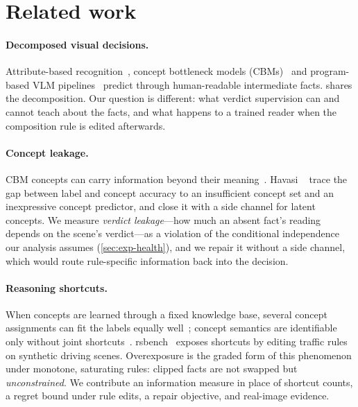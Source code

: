 \section{Related work}
\label{sec:related}

\paragraph{Decomposed visual decisions.} Attribute-based recognition~\cite{lampert2009attribute}, concept bottleneck models (CBMs)~\cite{koh2020cbm} and program-based VLM pipelines~\cite{gupta2023visprog,suris2023vipergpt} predict through human-readable intermediate facts. \lux shares the decomposition. Our question is different: what verdict supervision can and cannot teach about the facts, and what happens to a trained reader when the composition rule is edited afterwards.

\paragraph{Concept leakage.} CBM concepts can carry information beyond their meaning~\cite{margeloiu2021cbm,mahinpei2021promises}. Havasi \etal~\cite{havasi2022leakage} trace the gap between label and concept accuracy to an insufficient concept set and an inexpressive concept predictor, and close it with a side channel for latent concepts. We measure \emph{verdict leakage}---how much an absent fact's reading depends on the scene's verdict---as a violation of the conditional independence our analysis assumes (\cref{sec:exp-health}), and we repair it without a side channel, which would route rule-specific information back into the decision.

\paragraph{Reasoning shortcuts.} When concepts are learned through a fixed knowledge base, several concept assignments can fit the labels equally well~\cite{marconato2023not}; concept semantics are identifiable only without joint shortcuts~\cite{bortolotti2025shortcuts}. rsbench~\cite{bortolotti2024rsbench} exposes shortcuts by editing traffic rules on synthetic driving scenes. Overexposure is the graded form of this phenomenon under monotone, saturating rules: clipped facts are not swapped but \emph{unconstrained}. We contribute an information measure in place of shortcut counts, a regret bound under rule edits, a repair objective, and real-image evidence.

